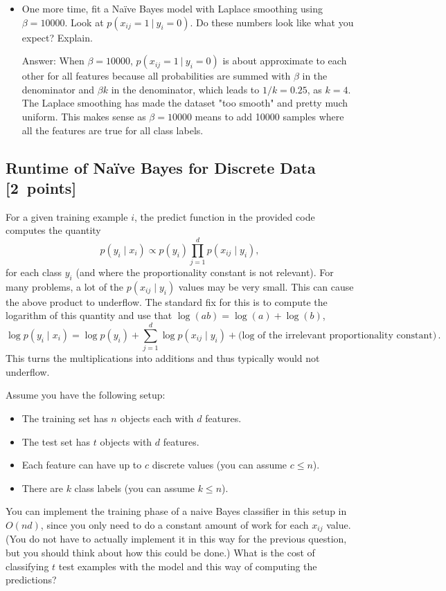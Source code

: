 \documentclass{article}
\newcommand{\blu}[1]{{\textcolor{blu}{#1}}}
\newcommand{\gre}[1]{\textcolor{gre}{#1}}
\newcommand\ans[1]{\par\gre{Answer: #1}}
\let\ask\blu
\newcommand\pts[1]{\textcolor{pointscolour}{[#1~points]}}
\begin{document}
\begin{itemize}
        \item One more time, fit a Na\"ive Bayes model with Laplace smoothing using $\beta=10000$. Look at $p(x_{ij} = 1 \ | \ y_i = 0)$. \ask{Do these numbers look like what you expect? Explain.}
        
        \ans{ When $\beta=10000$, $p(x_{ij} = 1 \ | \ y_i = 0)$ is about approximate to each other for all features because all probabilities are summed with $\beta$ in the denominator and $\beta k$ in the denominator, which leads to $1/k = 0.25$, as $k=4$. The Laplace smoothing has made the dataset "too smooth" and pretty much uniform. This makes sense as $\beta=10000$ means to add 10000 samples where all the features are true for all class labels.}
    \end{itemize}

    \clearpage
    \subsection{Runtime of Na\"ive Bayes for Discrete Data \pts{2}}

    For a given training example $i$, the predict function in the provided code computes the quantity
    \[
    p(y_i \mid x_i) \propto p(y_i)\prod_{j=1}^d p(x_{ij} \mid y_i),
    \]
    for each class $y_i$ (and where the proportionality constant is not relevant). For many problems, a lot of the $p(x_{ij} \mid y_i)$ values may be very small. This can cause the above product to underflow. The standard fix for this is to compute the logarithm of this quantity and use that $\log(ab) = \log(a)+\log(b)$,
    \[
    \log p(y_i \mid x_i) = \log p(y_i) + \sum_{j=1}^d \log p(x_{ij} \mid y_i) + \text{(log of the irrelevant proportionality constant)} \, .
    \]
    This turns the multiplications into additions and thus typically would not underflow.

    Assume you have the following setup:
    \begin{itemize}
        \item The training set has $n$ objects each with $d$ features.
        \item The test set has $t$ objects with $d$ features.
        \item Each feature can have up to $c$ discrete values (you can assume $c \leq n$).
        \item There are $k$ class labels (you can assume $k \leq n$).
    \end{itemize}
    You can implement the training phase of a naive Bayes classifier in this setup in $O(nd)$, since you only need to do a constant amount of work for each $x_{ij}$ value. (You do not have to actually implement it in this way for the previous question, but you should think about how this could be done.)
    \ask{What is the cost of classifying $t$ test examples with the model and this way of computing the predictions?}
    
\end{document}
